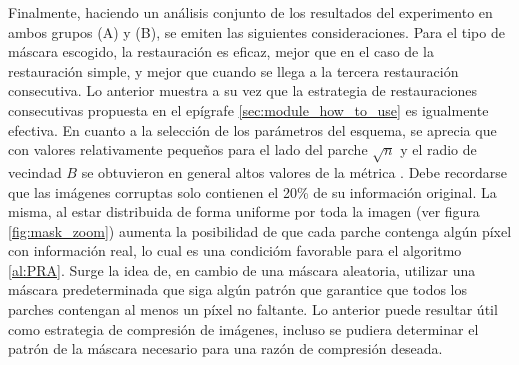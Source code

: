Finalmente, haciendo un an\'alisis conjunto de los resultados del experimento en ambos grupos (A) y (B), se emiten las siguientes consideraciones. Para el tipo de m\'ascara escogido, la restauraci\'on \SOP es eficaz, mejor que \TELEA en el caso de la restauraci\'on simple, y mejor que \NS cuando se llega a la tercera restauraci\'on consecutiva. Lo anterior muestra a su vez que la estrategia de restauraciones consecutivas propuesta en el ep\'igrafe \ref{sec:module_how_to_use} es igualmente efectiva. En cuanto a la selecci\'on de los par\'ametros del esquema, se aprecia que con valores relativamente pequeños para el lado del parche $\sqrt{n}$ y el radio de vecindad $B$ se obtuvieron en general altos valores de la m\'etrica \PSNR. Debe recordarse que las im\'agenes corruptas solo contienen el 20\% de su informaci\'on original. La misma, al estar distribuida de forma uniforme por toda la imagen (ver figura \ref{fig:mask_zoom}) aumenta la posibilidad de que cada parche contenga alg\'un p\'ixel con informaci\'on real, lo cual es una condici\'om favorable para el algoritmo \ref{al:PRA}. Surge la idea de, en cambio de una m\'ascara aleatoria, utilizar una m\'ascara predeterminada que siga alg\'un patr\'on que garantice que todos los parches contengan al menos un p\'ixel no faltante. Lo anterior puede resultar \'util como estrategia de compresi\'on de im\'agenes, incluso se pudiera determinar el patr\'on de la m\'ascara necesario para una raz\'on de compresi\'on deseada. 

